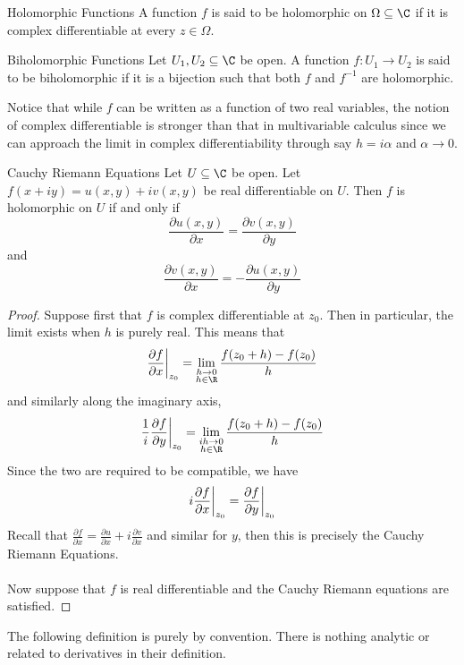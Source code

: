 \documentclass[a4paper]{article}
\begin{document}
\begin{defn}{Holomorphic Functions}{} A function $f$ is said to be holomorphic on $\Omega\subseteq\C$ if it is complex differentiable at every $z\in\Omega$. 
\end{defn}

\begin{defn}{Biholomorphic Functions}{} Let $U_1,U_2\subseteq\C$ be open. A function $f:U_1\to U_2$ is said to be biholomorphic if it is a bijection such that both $f$ and $f^{-1}$ are holomorphic. 
\end{defn}

Notice that while $f$ can be written as a function of two real variables, the notion of complex differentiable is stronger than that in multivariable calculus since we can approach the limit in complex differentiability through say $h=i\alpha$ and $\alpha\to 0$. 

\begin{thm}{Cauchy Riemann Equations}{} Let $U\subseteq\C$ be open. Let $f(x+iy)=u(x,y)+iv(x,y)$ be real differentiable on $U$. Then $f$ is holomorphic on $U$ if and only if $$\frac{\partial u(x,y)}{\partial x}=\frac{\partial v(x,y)}{\partial y}$$ and $$\frac{\partial v(x,y)}{\partial x}=-\frac{\partial u(x,y)}{\partial y}$$\tcbline
\begin{proof}
Suppose first that $f$ is complex differentiable at $z_0$. Then in particular, the limit exists when $h$ is purely real. This means that $$\frac{\partial f}{\partial x}\bigg{|}_{z_0}=\lim_{\substack{h\to 0\\h\in\R}}\frac{f(z_0+h)-f(z_0)}{h}$$ and similarly along the imaginary axis, $$\frac{1}{i}\frac{\partial f}{\partial y}\bigg{|}_{z_0}=\lim_{\substack{ih\to 0\\h\in\R}}\frac{f(z_0+h)-f(z_0)}{h}$$ Since the two are required to be compatible, we have $$i\frac{\partial f}{\partial x}\bigg{|}_{z_0}=\frac{\partial f}{\partial y}\bigg{|}_{z_0}$$ Recall that $\frac{\partial f}{\partial x}=\frac{\partial u}{\partial x}+i\frac{\partial v}{\partial x}$ and similar for $y$, then this is precisely the Cauchy Riemann Equations. \\~\\
Now suppose that $f$ is real differentiable and the Cauchy Riemann equations are satisfied. 
\end{proof}
\end{thm}

The following definition is purely by convention. There is nothing analytic or related to derivatives in their definition. 
\end{document}

